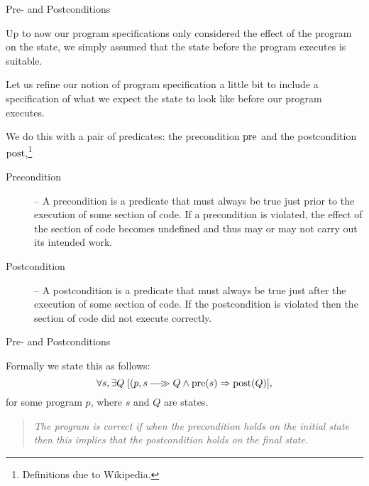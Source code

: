 \documentclass{beamer}
\begin{document}
\begin{frame}[fragile]{Pre- and Postconditions}

\scriptsize

Up to now our program specifications only considered the effect of the program on
the state, we simply assumed that the state before the program executes is suitable.

\vspace{.1in}

Let us refine our notion of program specification a little bit to include a specification
of what we expect the state to look like before our program executes.

\vspace{.1in}

We do this with a pair of predicates: the precondition $\rm pre$ and the postcondition $\rm post$,\footnote{\tiny Definitions due to Wikipedia.}
\begin{description}
\item[Precondition] --
A precondition is a predicate
that must always be true just prior to the execution of some section of code. 
If a precondition is violated,
the effect of the section of code becomes undefined and thus may or may not
carry out its intended work. 

\item[Postcondition] --
A postcondition is a predicate that must always be true just after the execution of some section of code.  If the postcondition is violated then the section of code did not execute correctly.
\end{description}

\end{frame}

\begin{frame}[fragile]{Pre- and Postconditions}

\small

Formally we state this as follows:
\[
\forall s,\exists Q\; [{(p,s}-\!\!-\!\!\!\!\gg{Q} \wedge {\rm pre}(s) \Rightarrow{\rm post}(Q)],
\]
for some program $p$, where $s$ and $Q$ are states.

\vspace{.1in}

\begin{quote}
\it The program is correct if when the precondition holds on the initial state then this implies that the
postcondition holds on the final state.
\end{quote}
\end{frame}
\end{document}
